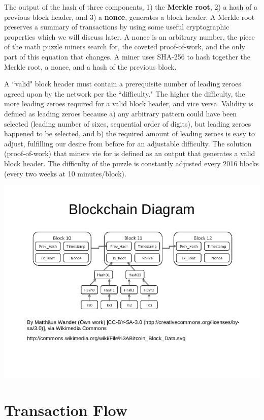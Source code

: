 \documentclass[11pt]{article}
\begin{document}
    The output of the hash of three components, 1) the \textbf{Merkle root}, 2) a hash of a previous block header, and 3) a \textbf{nonce}, generates a block header. A Merkle root preserves a summary of transactions by using some useful cryptographic properties which we will discuss later. A nonce is an arbitrary number, the piece of the math puzzle miners search for, the coveted proof-of-work, and the only part of this equation that changes. A miner uses SHA-256 to hash together the Merkle root, a nonce, and a hash of the previous block. 
    
    A ``valid" block header must contain a prerequisite number of leading zeroes agreed upon by the network per the ``difficulty." The higher the difficulty, the more leading zeroes required for a valid block header, and vice versa. Validity is defined as leading zeroes because a) any arbitrary pattern could have been selected (leading number of sixes, sequential order of digits), but leading zeroes happened to be selected, and b) the required amount of leading zeroes is easy to adjust, fulfilling our desire from before for an adjustable difficulty. The solution (proof-of-work) that miners vie for is defined as an output that generates a valid block header. The difficulty of the puzzle is constantly adjusted every 2016 blocks (every two weeks at 10 minutes/block).
    
   \includegraphics[scale=0.65]{blockchain_diagram}
   
   \section*{Transaction Flow}
   
\end{document}
